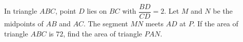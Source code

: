 In triangle $ABC$, point $D$ lies on $BC$ with $\dfrac{BD}{CD}=2$. Let $M$ and $N$ be the midpoints of $AB$ and $AC$. The segment $MN$ meets $AD$ at $P$. If the area of triangle $ABC$ is $72$, find the area of triangle $PAN$.
